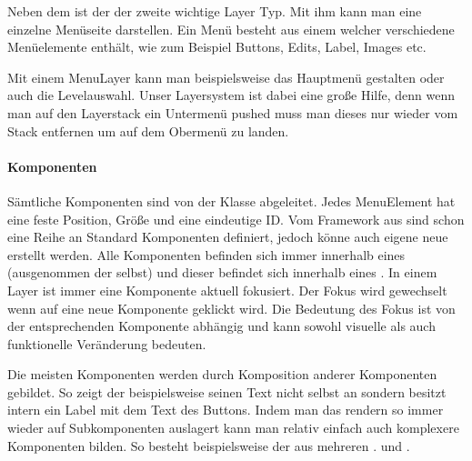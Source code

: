 Neben dem  ist der  der zweite wichtige Layer Typ. Mit ihm kann man eine einzelne Menüseite darstellen.
Ein Menü besteht aus einem  welcher verschiedene Menüelemente enthält, wie zum Beispiel Buttons, Edits, Label, Images etc.

Mit einem MenuLayer kann man beispielsweise das Hauptmenü gestalten oder auch die Levelauswahl. Unser Layersystem ist dabei eine große Hilfe, denn wenn man auf den Layerstack ein Untermenü pushed muss man dieses nur wieder vom Stack entfernen um auf dem Obermenü zu landen.

\paragraph{Komponenten}

Sämtliche Komponenten sind von der Klasse  abgeleitet. Jedes MenuElement hat eine feste Position, Größe und eine eindeutige ID. Vom Framework aus sind schon eine Reihe an Standard Komponenten definiert, jedoch könne auch eigene neue erstellt werden.
Alle Komponenten befinden sich immer innerhalb eines  (ausgenommen der  selbst) und dieser befindet sich innerhalb eines . In einem Layer ist immer eine Komponente aktuell fokusiert. Der Fokus wird gewechselt wenn auf eine neue Komponente geklickt wird. Die Bedeutung des Fokus ist von der entsprechenden Komponente abhängig und kann sowohl visuelle als auch funktionelle Veränderung bedeuten.


Die meisten Komponenten werden durch Komposition anderer Komponenten gebildet. So zeigt der  beispielsweise seinen Text nicht selbst an sondern besitzt intern ein Label mit dem Text des Buttons. Indem man das rendern so immer wieder auf Subkomponenten auslagert kann man relativ einfach auch komplexere Komponenten bilden. So besteht beispielsweise der  aus mehreren .  und . 

